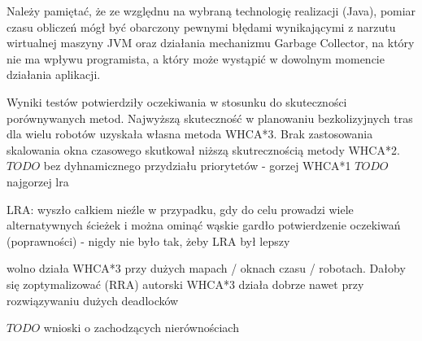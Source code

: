 Należy pamiętać, że ze względnu na wybraną technologię realizacji (Java), pomiar czasu obliczeń mógł być obarczony pewnymi błędami wynikającymi z narzutu wirtualnej maszyny JVM oraz działania mechanizmu Garbage Collector, na który nie ma wpływu programista, a który może wystąpić w dowolnym momencie działania aplikacji.

Wyniki testów potwierdziły oczekiwania w stosunku do skuteczności porównywanych metod.
Najwyższą skuteczność w planowaniu bezkolizyjnych tras dla wielu robotów uzyskała własna metoda WHCA*3.
Brak zastosowania skalowania okna czasowego skutkował niższą skutrecznością metody WHCA*2.
$TODO$ bez dyhnamicznego przydziału priorytetów - gorzej WHCA*1
$TODO$ najgorzej lra

LRA: wyszło całkiem nieźle w przypadku, gdy do celu prowadzi wiele alternatywnych ścieżek i można ominąć wąskie gardło
potwierdzenie oczekiwań (poprawności) - nigdy nie było tak, żeby LRA był lepszy

wolno działa WHCA*3 przy dużych mapach / oknach czasu / robotach. Dałoby się zoptymalizować (RRA)
autorski WHCA*3 działa dobrze nawet przy rozwiązywaniu dużych deadlocków

$TODO$ wnioski o zachodzących nierównościach
